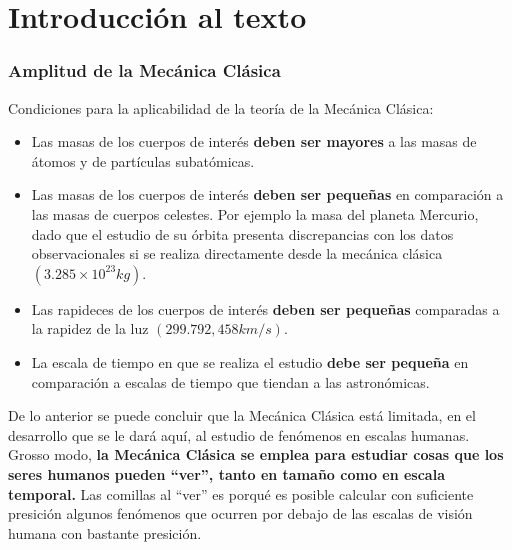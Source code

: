 \documentclass[/home/hernan/Documentos/Apuntes_mecanica_teorica/main.tex]{subfiles}
\begin{document}
    \part{Introducción al texto}
    \label{part: intro}
    
    \section{Amplitud de la Mecánica Clásica}


    Condiciones para la aplicabilidad de la teoría de la Mecánica Clásica:

    \begin{itemize}
        \item Las masas de los cuerpos de interés \textbf{deben ser mayores} a las masas de átomos y de partículas subatómicas.
        \item Las masas de los cuerpos de interés \textbf{deben ser pequeñas} en comparación a las masas de cuerpos celestes. Por ejemplo la masa del planeta Mercurio, dado que el estudio de su órbita presenta discrepancias con los datos observacionales si se realiza directamente desde la mecánica clásica $\left(3.285 \times 10^{23} kg\right)$.
        \item Las rapideces de los cuerpos de interés  \textbf{deben ser pequeñas} comparadas a la rapidez de la luz $\left(299.792,458 km/s\right)$.
        \item  La escala de tiempo en que se realiza el estudio \textbf{debe ser pequeña} en comparación a escalas de tiempo que tiendan a las astronómicas.
    \end{itemize}

    De lo anterior se puede concluir que la Mecánica Clásica está limitada, en el desarrollo que se le dará aquí, al estudio de fenómenos en escalas humanas. Grosso modo, \textbf{la Mecánica Clásica se emplea para estudiar cosas que los seres humanos pueden ``ver'', tanto en tamaño como en escala temporal.} Las comillas al ``ver'' es porqué es posible calcular con suficiente presición algunos fenómenos que ocurren por debajo de las escalas de visión humana con bastante presición.
\end{document}
